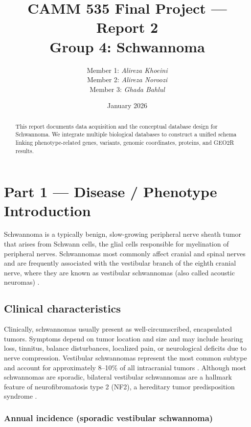 \documentclass[11pt]{article}
\title{CAMM 535 Final Project — Report 2\\Group 4: Schwannoma}
\author{
	Member 1: \textit{Alireza Khoeini} \\
	Member 2: \textit{Alireza Noroozi} \\
	Member 3: \textit{Ghada Bahlul}
}
\date{January 2026}
\begin{document}
	\maketitle
	
	\begin{abstract}
		This report documents data acquisition and the conceptual database design for Schwannoma.
		We integrate multiple biological databases to construct a unified schema linking phenotype-related
		genes, variants, genomic coordinates, proteins, and GEO2R results.
	\end{abstract}
	
	\tableofcontents
	\newpage
	
	\section{Part 1 — Disease / Phenotype Introduction}\label{sec:intro}
	Schwannoma is a typically benign, slow-growing peripheral nerve sheath tumor that arises
	from Schwann cells, the glial cells responsible for myelination of peripheral nerves.
	Schwannomas most commonly affect cranial and spinal nerves and are frequently associated
	with the vestibular branch of the eighth cranial nerve, where they are known as vestibular
	schwannomas (also called acoustic neuromas) \cite{review_schwannoma_2020}.
	
	\subsection{Clinical characteristics}
	Clinically, schwannomas usually present as well-circumscribed, encapsulated tumors.
	Symptoms depend on tumor location and size and may include hearing loss, tinnitus,
	balance disturbances, localized pain, or neurological deficits due to nerve compression.
	Vestibular schwannomas represent the most common subtype and account for approximately
	8--10\% of all intracranial tumors \cite{vestibular_epidemiology_2019}.
	Although most schwannomas are sporadic, bilateral vestibular schwannomas are a hallmark
	feature of neurofibromatosis type 2 (NF2), a hereditary tumor predisposition syndrome
	\cite{omim_nf2}.
	\subsubsection{Annual incidence (sporadic vestibular schwannoma)}
	
\end{document}
